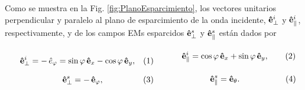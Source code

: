 Como se muestra en la Fig. \ref{fig:PlanoEsparcimiento}, los vectores unitarios perpendicular y paralelo al plano de esparcimiento de la onda incidente, $\vu{e}_{\perp}^i$  y $\vu{e}_{\parallel}^i$, respectivamente, y de los campos EMs esparcidos $\vu{e}_{\perp}^s$ y $\vu{e}_{\parallel}^s$ están dados por\\ \begin{subequations}
	\eqhalf{\vu{e}_{\perp}^i =-\, \hat{e}_\varphi  = \sin\varphi\,\vu{e}_x - \cos\varphi\,\vu{e}_y,}	
	\eqhalf{\vu{e}_{\parallel}^i = \cos\varphi\,\vu{e}_x + \sin\varphi\,\vu{e}_y,}	
	\label{eq:vecInc}\end{subequations}	\begin{subequations}
	\eqhalf{\vu{e}_{\perp}^s= - \, \vu{e}_\varphi,}	
	\eqhalf{\vu{e}_{\parallel}^s = \vu{e}_\theta.}	
	\label{eq:vecScat}\end{subequations}
	
